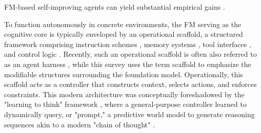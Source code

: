 \documentclass{article}
\begin{document}
FM-based self-improving agents can yield substantial empirical gains \citep{yuan2024self, acikgoz2025selfimprovingllmagentstesttime, qi2025webrl, zhang2025darwingodelmachineopenended}.


 To function autonomously in concrete environments, the FM serving as the cognitive core is typically enveloped by an operational {scaffold}, a structured framework comprising instruction schemes \citep{yuksekgonul2024textgradautomaticdifferentiationtext, guo2025evopromptconnectingllmsevolutionary}, memory systems \citep{chhikara2025mem0buildingproductionreadyai, zhang2026memrlselfevolvingagentsruntime}, tool interfaces \citep{qiu2025alitageneralistagentenabling, wölflein2025llmagentsmakingagent}, and control logic \citep{hong2023metagpt,10.5555/3692070.3694667,xiong2025beyond}. Recently, such an operational scaffold is often also referred to as an agent {harness} \citep{rajasekaran2026harnessdesign, trivedy2026agentharness, zhang2026selfharnessharnessesimprove, zhong2026aiharnessengineeringruntime}, while this survey uses the term scaffold to emphasize the modifiable structures surrounding the foundation model. Operationally, this scaffold acts as a controller that constructs context, selects actions, and enforces constraints. This modern architecture was conceptually foreshadowed by the "learning to think" framework \citep{schmidhuber2015learning}, where a general-purpose controller learned to dynamically query, or "prompt," a predictive world model to generate reasoning sequences akin to a modern "chain of thought" \citep{wei2022chain}.
\end{document}

